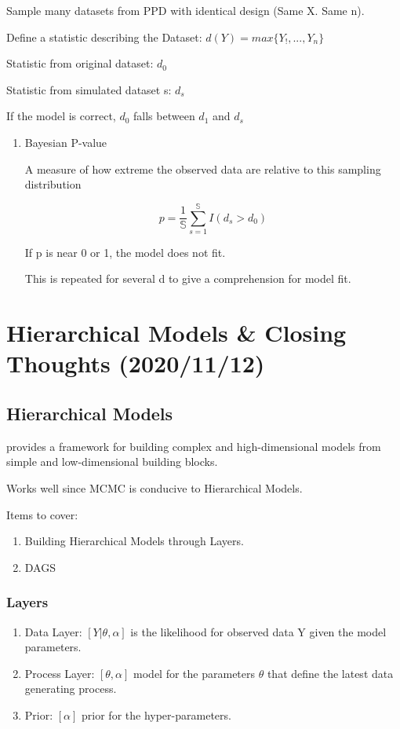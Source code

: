 \documentclass[11pt]{article}
\begin{document}
Sample many datasets from PPD with identical design  (Same X. Same n).

Define a statistic describing the Dataset: \(d(Y) = max \{ Y_!, ..., Y_n\}\)

Statistic from original dataset: \(d_0\)

Statistic from simulated dataset s: \(d_s\)

If the model is correct, \(d_0\) falls between \(d_1\) and \(d_s\)

\begin{enumerate}
\item Bayesian P-value
\label{sec:orgc995d52}

A measure of how extreme the observed data are relative to this sampling
distribution

$$
p = \frac{1}{\mathbb S} \sum_{s = 1}^{\mathbb S} I (d_s > d_0)
$$

If p is near 0 or 1, the model does not fit.

This is repeated for several d to give a comprehension for model fit.
\end{enumerate}
\section{Hierarchical Models \& Closing Thoughts (2020/11/12)}
\label{sec:orgc0ab028}
\subsection{Hierarchical Models}
\label{sec:orge5d8c34}
provides a framework for building complex and high-dimensional models from simple and low-dimensional building blocks.

Works well since MCMC is conducive to Hierarchical Models.

Items to cover:
\begin{enumerate}
\item Building Hierarchical Models through Layers.
\item DAGS
\end{enumerate}

\subsubsection{Layers}
\label{sec:org04a61eb}

\begin{enumerate}
\item Data Layer: \([Y | \theta, \alpha]\) is the likelihood for observed data Y
given the model parameters.
\item Process Layer: \([\theta, \alpha]\) model for the parameters \(\theta\) that
define the latest data generating process.
\item Prior: \([\alpha]\) prior for the hyper-parameters.
\end{enumerate}
\end{document}
